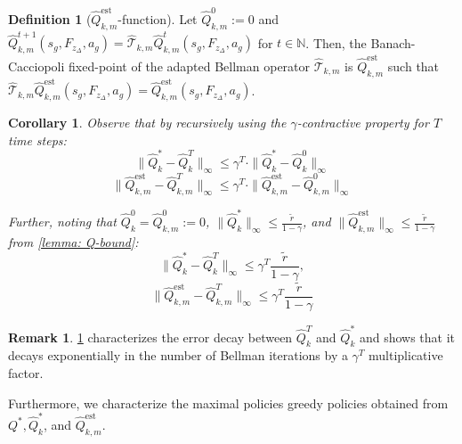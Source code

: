 \documentclass{article}
\theoremstyle{plain}
\newtheorem{corollary}[theorem]{Corollary}
\theoremstyle{definition}
\newtheorem{definition}[theorem]{Definition}
\newtheorem{remark}[theorem]{Remark}
\def\est{\mathrm{est}}
\def\N{\mathbb{N}}
\begin{document}
\begin{definition}[$\hat{Q}_{k,m}^\est$-function]\label{defn:qkmest}Let $\hat{Q}_{k,m}^0:=0$ and $\hat{Q}_{k,m}^{t+1}(s_g,F_{z_\Delta},a_g) = \hat{\mathcal{T}}_{k,m} \hat{Q}_{k,m}^t(s_g,F_{z_\Delta},a_g)$
    for $t\in\N$. Then, the Banach-Cacciopoli fixed-point of the adapted Bellman operator $\hat{\mathcal{T}}_{k,m}$ is $\hat{Q}^\est_{k,m}$ such that $\hat{\mathcal{T}}_{k,m} \hat{Q}^\est_{k,m}(s_g,F_{z_\Delta},a_g) = \hat{Q}^\est_{k,m}(s_g,F_{z_\Delta},a_g)$.
\end{definition}

\begin{corollary}\label{corollary:backprop}
    \emph{Observe that by recursively using the $\gamma$-contractive property for $T$  time steps: }\begin{equation}\|\hat{{Q}}_k^* - \hat{{Q}}_k^T\|_\infty \leq \gamma^T \cdot \|\hat{Q}_k^* - \hat{Q}_k^0\|_\infty\end{equation}
    \begin{equation}
    \|\hat{{Q}}_{k,m}^\est - \hat{{Q}}_{k,m}^T\|_\infty \leq \gamma^T \cdot \|\hat{Q}_{k,m}^\est - \hat{Q}^0_{k,m}\|_\infty
    \end{equation}
    
Further, noting that $\hat{Q}_k^0 = \hat{Q}_{k,m}^0 := 0$, $\|\hat{Q}_k^*\|_\infty \leq \frac{\tilde{r}}{1-\gamma}$, and $\|\hat{Q}_{k,m}^\est\|_\infty \leq \frac{\tilde{r}}{1-\gamma}$ from \cref{lemma: Q-bound}:
\begin{equation}\label{eqn: qstar,qt decay}\|\hat{Q}_k^* - \hat{Q}_k^T\|_\infty \leq \gamma^T \frac{\tilde{r}}{1-\gamma},\end{equation}
\begin{equation}\|\hat{Q}_{k,m}^\est - \hat{Q}_{k,m}^T\|_\infty \leq \gamma^T \frac{\tilde{r}}{1-\gamma}
\end{equation}
\end{corollary}

\begin{remark}
\cref{corollary:backprop} characterizes the error decay between $\hat{Q}_k^T$ and $\hat{Q}_k^*$ and shows that it decays exponentially in the number of Bellman iterations by a $\gamma^T$ multiplicative factor.
\end{remark}

Furthermore, we characterize the maximal policies greedy policies obtained from $Q^*, \hat{Q}_k^*$, and $\hat{Q}_{k,m}^\est$.
\end{document}
